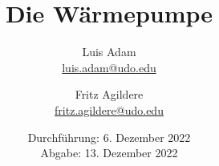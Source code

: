 

\subject{\texorpdfstring{\vspace{2ex}}{}206\texorpdfstring{\vspace{-2ex}}{}} %
\title{Die Wärmepumpe} %
\date{
	Durchführung: 6. Dezember 2022 %
	\\ Abgabe: 13. Dezember 2022 %
}
\author{
	Luis Adam\\ %
	\href{mailto:luis.adam@udo.edu}{luis.adam@udo.edu} %
	\and
	Fritz Agildere\\ %
	\href{mailto:fritz.agildere@udo.edu}{fritz.agildere@udo.edu} %
}



\maketitle
{}

\thispagestyle{empty}
\tableofcontents
\newpage






\printbibliography{}


